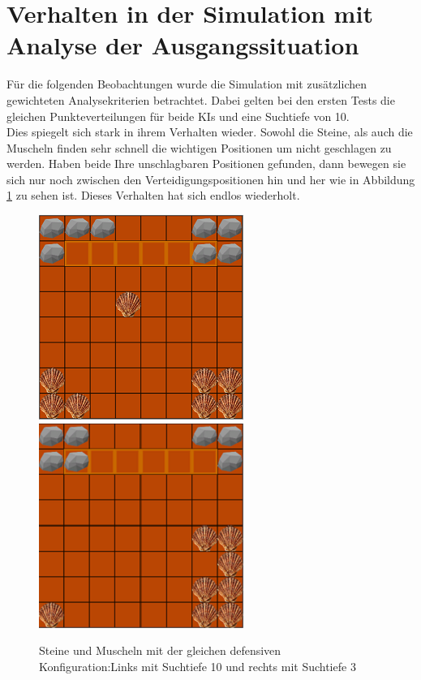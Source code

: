 \section{Verhalten in der Simulation mit Analyse der Ausgangssituation}
\label{ch:Evaluierung:sec:SimulationWithAnalyse}
Für die folgenden Beobachtungen wurde die Simulation mit zusätzlichen gewichteten Analysekriterien betrachtet. Dabei gelten bei den ersten Tests die gleichen Punkteverteilungen für beide KIs und eine Suchtiefe von 10.\\
Dies spiegelt sich stark in ihrem Verhalten wieder. Sowohl die Steine, als auch die Muscheln finden sehr schnell die wichtigen Positionen um nicht geschlagen zu werden. Haben beide Ihre unschlagbaren Positionen gefunden, dann bewegen sie sich nur noch zwischen den Verteidigungspositionen hin und her wie in Abbildung \ref{fig:hinundher} zu sehen ist. Dieses Verhalten hat sich endlos wiederholt.
\begin{figure}[h]
	\centering
	\includegraphics{img/mitAnalyse/hinundherCorner}
		\includegraphics{img/mitAnalyse/hinundherCorner3}
	\caption{Steine und Muscheln mit der gleichen defensiven Konfiguration:\newline Links mit Suchtiefe 10 und rechts mit Suchtiefe 3}
	\label{fig:hinundher}
\end{figure}

